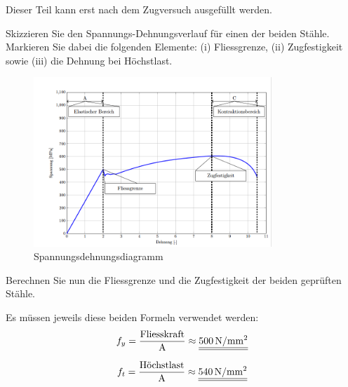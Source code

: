 \begin{questions}
    \begin{tcolorbox}
        Dieser Teil kann erst nach dem Zugversuch ausgefüllt werden.
    \end{tcolorbox}

    \question
    Skizzieren Sie den Spannungs-Dehnungsverlauf für einen der beiden Stähle.
    Markieren Sie dabei die folgenden Elemente: (i) Fliessgrenze, (ii) Zugfestigkeit sowie (iii) die Dehnung bei Höchstlast.

    \begin{solution}
        \begin{figure}[H]
            \centering
            \includegraphics[width=0.8\textwidth]{Lsg}
            \caption{Spannungsdehnungsdiagramm}
            \label{fig:Spannungsdehnungsdiagramm}
        \end{figure}
    \end{solution}

    \question
    Berechnen Sie nun die Fliessgrenze und die Zugfestigkeit der beiden geprüften Stähle.

    \begin{solution}
        Es müssen jeweils diese beiden Formeln verwendet werden:
        \begin{equation*}
            f_{y}  =
            \dfrac{\text{Fliesskraft}}{\text{A}} \approx \FinRes{\myNmm{500}}
        \end{equation*}


        \begin{equation*}
            f_{t}  =
            \dfrac{\text{Höchstlast}}{\text{A}} \approx \FinRes{\myNmm{540}}
        \end{equation*}

    \end{solution}




\end{questions}
